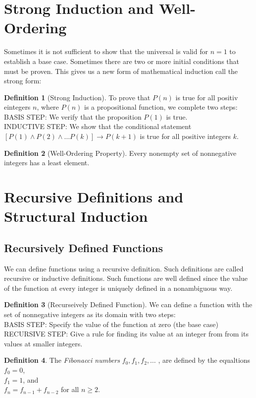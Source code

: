 \documentclass[11pt]{book} %
\theoremstyle {definition}
\newtheorem {definition}{Definition}[section]
\theoremstyle {remark}
\begin{document}
\section {Strong Induction and Well-Ordering}
Sometimes it is not sufficient to show that the universal is valid for $n=1$ to establish a base case. Sometimes there are two or more initial conditions that must be proven. This gives us a new form of mathematical induction call the strong form:\\
\begin{definition}[Strong Induction]
To prove that $P(n)$ is true for all positiv eintegers $n$, where $P(n)$ is a propositional function, we complete two steps: \\
BASIS STEP: We verify that the proposition $P(1)$ is true.\\
INDUCTIVE STEP: We show that the conditional statement $[P(1) \land P(2) \land \dots P(k)] \rightarrow P(k+1)$ is true for all positive integers $k$.
\end{definition}

\begin{definition}[Well-Ordering Property]
Every nonempty set of nonnegative integers has a least element.
\end{definition}
 

\section {Recursive Definitions and Structural Induction}
 
  \subsection {Recursively Defined Functions}
We can define functions using a recursive definition. Such definitions are called recursive or inductive definitions. Such functions are well defined since the value of the function at every integer is uniquely defined in a nonambiguous way.
\begin{definition}[Recurseively Defined Function]
We can define a function with the set of nonnegative integers as its domain with two steps:\\
BASIS STEP: Specify the value of the function at zero (the base case)\\
RECURSIVE STEP: Give a rule for finding its value at an integer from from its values at smaller integers.
\end{definition}

\begin{definition}
The \textit{Fibonacci numbers} $f_0,f_1,f_2, \dots$ , are defined by the equaltions
 $f_0=0$,\\
$f_1=1$, and \\
$f_n=f_{n-1} + f_{n-2}$ for all $n \ge 2$.
\end{definition}
\end{document}
